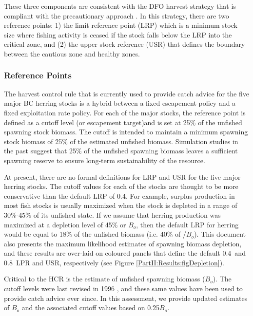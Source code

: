 These three components are consistent with the DFO harvest strategy that is compliant with the precautionary approach \citep{dfo2006}.  In this strategy, there are two reference points: 1) the limit reference point (LRP) which is a minimum stock size where fishing activity is ceased if the stock falls below the LRP into the critical zone, and (2) the upper stock reference (USR) that defines the boundary between the cautious zone and healthy zones.

\subsubsection{Reference Points} %
\label{ssub:reference_points}
The harvest control rule that is currently used to provide catch advice for the five major BC herring stocks is a hybrid between a fixed escapement policy and a fixed exploitation rate policy.  For each of the major stocks, the reference point is defined as a cutoff level (or escapement target)and is set at 25\% of the unfished spawning stock biomass.  The cutoff is intended to maintain a minimum spawning stock biomass of 25\% of the estimated unfished biomass.  Simulation studies in the past \citep{haist1986stock,hall1988alternative} suggest that 25\% of the unfished spawning biomass leaves a sufficient spawning reserve to ensure long-term sustainability of the resource.

At present, there are no formal definitions for LRP and USR for the five major herring stocks.  The cutoff values for each of the stocks are thought to be more conservative than the default LRP of 0.4\bmsy.  For example, surplus production in most fish stocks is usually maximized when the stock is depleted in a range of 30\%-45\% of its unfished state.  If we assume that herring production was maximized at a depletion level of 45\% or $B_o$, then the default LRP for herring would be equal to 18\% of the unfished biomass (i.e. 40\% of \bmsy/$B_o$).  This document also presents the maximum likelihood estimates of spawning biomass depletion, and these results are over-laid on coloured panels that define the default 0.4\bmsy\ and 0.8\bmsy\ LPR and USR, respectively (see Figure \ref{PartII:Results:figDepletion}).

Critical to the HCR is the estimate of unfished spawning biomass ($B_o$).  The cutoff levels were last revised in 1996 \citep{schweigert1996stock}, and these same values have been used to provide catch advice ever since.  In this assessment, we provide updated estimates of $B_o$ and the associated cutoff values based on 0.25$B_o$.

